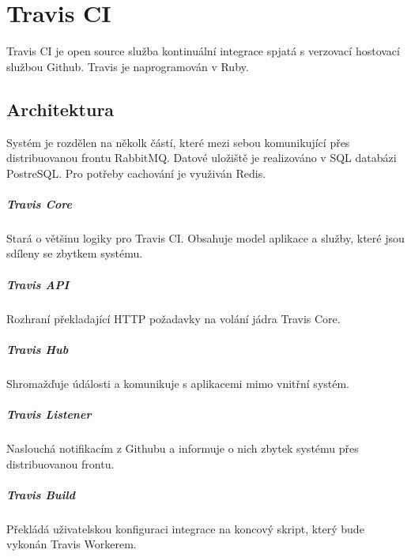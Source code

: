 \chapter{Travis CI}

Travis CI je open source služba kontinuální integrace spjatá s verzovací hostovací službou Github.
Travis je naprogramován v Ruby.


\section{Architektura}

Systém je rozdělen na několk částí, které mezi sebou komunikující přes distribuovanou frontu RabbitMQ.
Datové uložiště je realizováno v SQL databázi PostreSQL.
Pro potřeby cachování je využiván Redis.

\paragraph{Travis Core}

Stará o většinu logiky pro Travis CI.
Obsahuje model aplikace a služby, které jsou sdíleny se zbytkem systému.

\paragraph{Travis API}

Rozhraní překladající HTTP požadavky na volání jádra Travis Core.

\paragraph{Travis Hub}

Shromažďuje údálosti a komunikuje s aplikacemi mimo vnitřní systém.

\paragraph{Travis Listener}

Naslouchá notifikacím z Githubu a informuje o nich zbytek systému přes distribuovanou frontu.

\paragraph{Travis Build}

Překládá uživatelskou konfiguraci integrace na koncový skript, který bude vykonán Travis Workerem.

